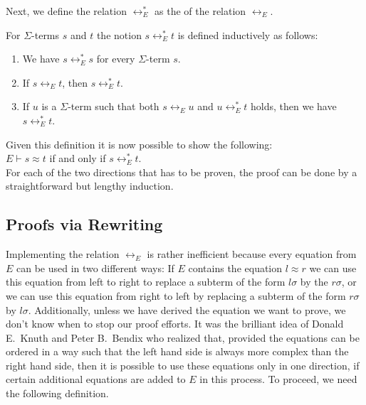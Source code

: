 Next, we define the relation $\leftrightarrow_E^*$ as the  of the relation
$\leftrightarrow_E$.
\begin{Definition}[$\leftrightarrow_E^*$]
  For $\Sigma$-terms $s$ and $t$ the notion $s \leftrightarrow_E^* t$ is defined inductively as follows:
  \begin{enumerate}
  \item We have $s \leftrightarrow_E^* s$ for every $\Sigma$-term $s$.
  \item If $s \leftrightarrow_E t$, then $s \leftrightarrow_E^* t$.
  \item If $u$ is a $\Sigma$-term such that both $s \leftrightarrow_E u$ and $u \leftrightarrow_E^* t$ holds,
        then we have $s \leftrightarrow_E^* t$. \eod
  \end{enumerate}
\end{Definition}

\noindent
Given this definition it is now possible to show the following:
\\[0.2cm]
\hspace*{1.3cm}
$E \vdash s \approx t$ \quad if and only if \quad $s \leftrightarrow_E^* t$.
\\[0.2cm]
For each of the two directions that has to be proven, the proof can be done by a straightforward but lengthy
induction. 

\subsection{Proofs via Rewriting}
Implementing the relation $\leftrightarrow_E$ is rather inefficient because every equation from $E$ can
be used in two different ways:  If $E$ contains the equation $l \approx r$ we can use this equation from left to right
to replace a subterm of the form $l\sigma$ by the $r\sigma$, or we can use this equation from right to left by
replacing a subterm of the form $r\sigma$ by $l\sigma$.  Additionally, unless we have derived the equation we
want to prove, we don't know when to stop our proof efforts. It was the brilliant idea of Donald E.~Knuth and
Peter B.~Bendix \cite{knuth:1970} who
realized that, provided the equations can be ordered in a way such that the left hand side is always more
complex than the right hand side, then it is possible to use these equations only in one direction, if certain
additional equations are added to $E$ in this process.  To proceed, we need the following definition.

